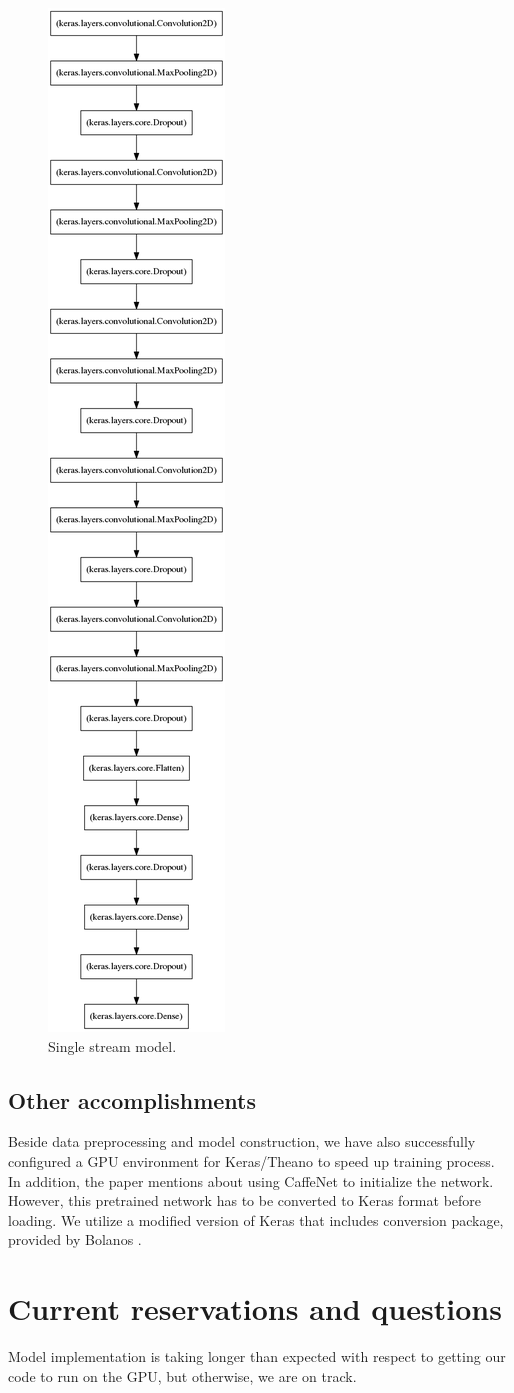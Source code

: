 \documentclass[paper=letter, fontsize=12pt]{article}
\begin{document}
\begin{figure}[htbp]
	\centering
	\includegraphics[width=.24\textwidth]{stream_model}
	\caption{Single stream model.}
	\label{fig:stream_model}
\end{figure}

\subsection{Other accomplishments}
Beside data preprocessing and model construction, we have also successfully configured a GPU environment for Keras/Theano to speed up training process. In addition, the paper mentions about using CaffeNet to initialize the network. However, this pretrained network has to be converted to Keras format before loading. We utilize a modified version of Keras that includes conversion package, provided by Bolanos \cite{Bolanos2016}.

\section{Current reservations and questions}

Model implementation is taking longer than expected with respect to getting our code to run on the GPU, but otherwise, we are on track.





\end{document}
